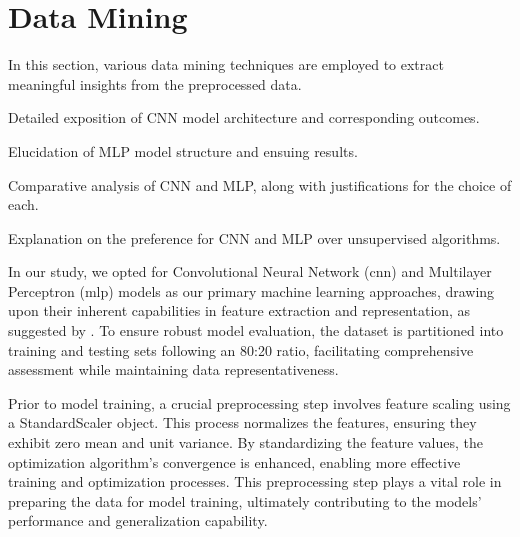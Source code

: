 \section{Data Mining}\label{data_mining}

In this section, various data mining techniques are employed to extract meaningful insights from the preprocessed data.

\begin{description}[style=nextline]
    \item[Convolution Neural Network (CNN):] Detailed exposition of CNN model architecture and corresponding outcomes.
    \item[Multilayer Perceptron (MLP):] Elucidation of MLP model structure and ensuing results.
    \item[Comparison Between CNN and MLP:] Comparative analysis of CNN and MLP, along with justifications for the choice of each.
    \item[Unsupervised Machine Learning Algorithms:] Explanation on the preference for CNN and MLP over unsupervised algorithms.
\end{description}



In our study, we opted for Convolutional Neural Network (\acrshort{cnn}) and Multilayer Perceptron (\acrshort{mlp}) models as our primary machine learning approaches, drawing upon their inherent capabilities in feature extraction and representation, as suggested by \cite{jiang_uwb_2020}. To ensure robust model evaluation, the dataset is partitioned into training and testing sets following an 80:20 ratio, facilitating comprehensive assessment while maintaining data representativeness.

Prior to model training, a crucial preprocessing step involves feature scaling using a StandardScaler object. This process normalizes the features, ensuring they exhibit zero mean and unit variance. By standardizing the feature values, the optimization algorithm's convergence is enhanced, enabling more effective training and optimization processes. This preprocessing step plays a vital role in preparing the data for model training, ultimately contributing to the models' performance and generalization capability.




